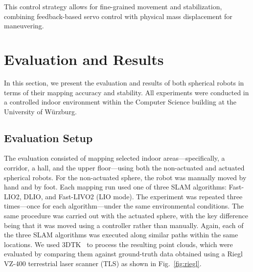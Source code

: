 \documentclass[conference]{IEEEtran}
\begin{document}

This control strategy allows for fine-grained movement and stabilization, combining feedback-based servo control with physical mass displacement for maneuvering.


\section{Evaluation and Results}
In this section, we present the evaluation and results of both spherical robots in terms of their mapping accuracy and stability.
All experiments were conducted in a controlled indoor environment within the Computer Science building at the University of Würzburg.

\subsection{Evaluation Setup}
The evaluation consisted of mapping selected indoor areas—specifically, a corridor, a hall, and the upper floor—using both the non-actuated and actuated spherical robots. 
For the non-actuated sphere, the robot was manually moved by hand and by foot. 
Each mapping run used one of three SLAM algorithms: Fast-LIO2, DLIO, and Fast-LIVO2 (LIO mode). 
The experiment was repeated three times—once for each algorithm—under the same environmental conditions. 
The same procedure was carried out with the actuated sphere, with the key difference being that it was moved using a controller rather than manually. 
Again, each of the three SLAM algorithms was executed along similar paths within the same locations. 
We used 3DTK~\cite{3dtk} to process the resulting point clouds, which were evaluated by comparing them against ground-truth data obtained using a Riegl VZ-400 terrestrial laser scanner (TLS) as shown in Fig.~\ref{fig:riegl}.
\end{document}
